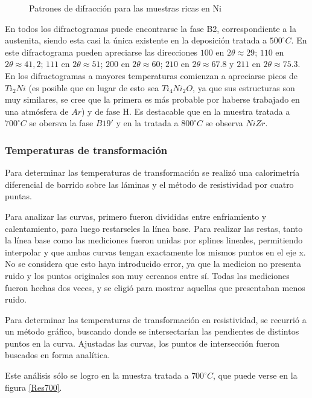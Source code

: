 \documentclass{article}
\theoremstyle{definition}
\theoremstyle{remark}
\begin{document}
\begin{figure}[H]
\caption{Patrones de difracción para las muestras ricas en Ni}
\label{RXNiRich}
\end{figure}

En todos los difractogramas puede encontrarse la fase B2, correspondiente a la austenita, siendo esta casi la única existente en la deposición tratada a $500 ^\circ C$. En este difractograma pueden apreciarse las direcciones $100$ en $2\theta \approx 29$; $110$ en $2\theta \approx 41,2$; $111$ en $2\theta \approx 51$; $200$ en $2\theta \approx 60$; $210$ en $2\theta \approx 67.8$ y $211$ en $2\theta \approx 75.3$. En los difractogramas a mayores temperaturas comienzan a apreciarse picos de $Ti_2Ni$ (es posible que en lugar de esto sea $Ti_4Ni_2O$, ya que sus estructuras son muy similares, se cree que la primera es más probable por haberse trabajado en una atmósfera de $Ar$) y de fase H. Es destacable que en la muestra tratada a $700 ^\circ C$ se obersva la fase $B19'$ y en la tratada a $800 ^\circ C$ se observa $NiZr$.

\subsubsection{Temperaturas de transformación}
Para determinar las temperaturas de transformación se realizó una calorimetría diferencial de barrido sobre las láminas y el método de resistividad por cuatro puntas.

Para analizar las curvas, primero fueron divididas entre enfriamiento y calentamiento, para luego restarseles la línea base. Para realizar las restas, tanto la línea base como las mediciones fueron unidas por splines lineales, permitiendo interpolar y que ambas curvas tengan exactamente los mismos puntos en el eje x. No se considera que esto haya introducido error, ya que la medicion no presenta ruido y los puntos originales son muy cercanos entre sí. Todas las mediciones fueron hechas dos veces, y se eligió para mostrar aquellas que presentaban menos ruido.

Para determinar las temperaturas de transformación en resistividad, se recurrió a un método gráfico, buscando donde se intersectarían las pendientes de distintos puntos en la curva. Ajustadas las curvas, los puntos de intersección fueron buscados en forma analítica.

Este análisis sólo se logro en la muestra tratada a $700 ^\circ C$, que puede verse en la figura \ref{Res700}.
\end{document}
